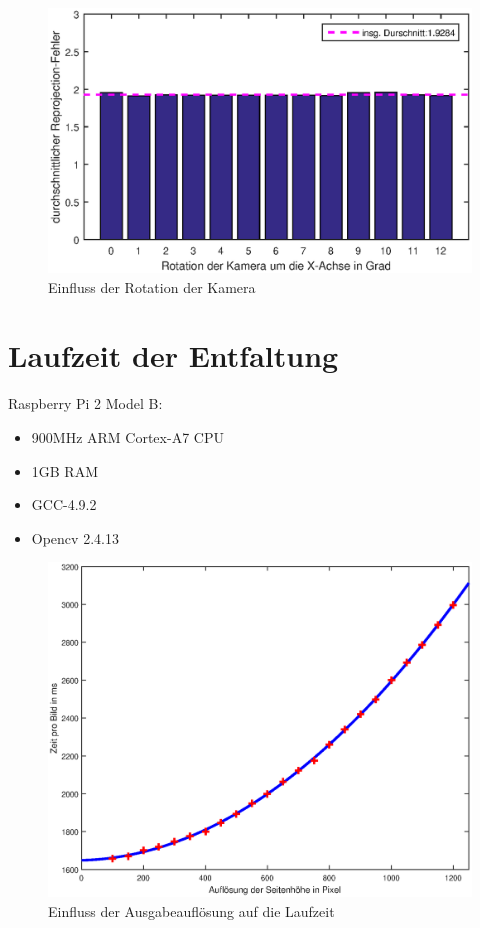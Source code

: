 \begin{figure}[!htb]
	\centering
	\includegraphics[width=\textwidth]{images/reprojectionErrorDeg2.eps}
	\caption{Einfluss der Rotation der Kamera}
	\label{fig:influenceRot}
\end{figure}


\section{Laufzeit der Entfaltung}


Raspberry Pi 2 Model B:
\begin{itemize}
	\item 900MHz ARM Cortex-A7 CPU
	\item 1GB RAM
	\item GCC-4.9.2
	\item Opencv 2.4.13
\end{itemize}

\begin{figure}[!htb]
	\centering
	\includegraphics[width=\textwidth]{images/runningTimePerSlantheight.eps}
	\caption{Einfluss der Ausgabeauflösung auf die Laufzeit}
	\label{fig:influenceRes2}
\end{figure}




